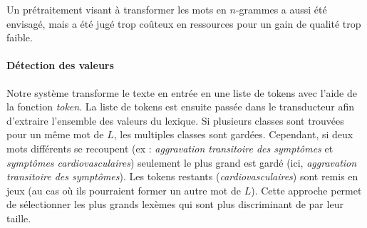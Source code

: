 Un prétraitement visant à transformer les mots en $n$-grammes a aussi été envisagé, mais a été jugé trop coûteux en ressources pour un gain de qualité trop faible.

\paragraph{Détection des valeurs}
Notre système transforme le texte en entrée en une liste de tokens avec l'aide de la fonction \textit{token}.
La liste de tokens est ensuite passée dans le transducteur afin d'extraire l'ensemble des valeurs du lexique.
Si plusieurs classes sont trouvées pour un même mot de $L$, les multiples classes sont gardées.
Cependant, si deux mots différents se recoupent (ex : \emph{aggravation transitoire des symptômes} et \emph{symptômes cardiovasculaires}) seulement le plus grand est gardé (ici, \emph{aggravation transitoire des symptômes}).
Les tokens restants (\emph{cardiovasculaires}) sont remis en jeux (au cas où ils pourraient former un autre mot de $L$).
Cette approche permet de sélectionner les plus grands lexèmes qui sont plus discriminant de par leur taille.

